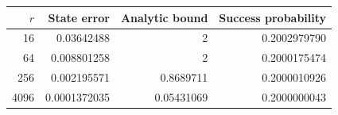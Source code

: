 \begin{tabular}{rrrr}\toprule $r$ & State error & Analytic bound & Success probability\\\midrule
16 & 0.03642488 & 2 & 0.2002979790\\
64 & 0.008801258 & 2 & 0.2000175474\\
256 & 0.002195571 & 0.8689711 & 0.2000010926\\
4096 & 0.0001372035 & 0.05431069 & 0.2000000043\\
\bottomrule\end{tabular}
